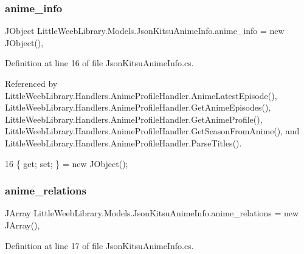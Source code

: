\subsubsection{\texorpdfstring{anime\+\_\+info}{anime\_info}}
{\footnotesize\ttfamily J\+Object Little\+Weeb\+Library.\+Models.\+Json\+Kitsu\+Anime\+Info.\+anime\+\_\+info = new J\+Object()\hspace{0.3cm}{\ttfamily [get]}, {\ttfamily [set]}}



Definition at line 16 of file Json\+Kitsu\+Anime\+Info.\+cs.



Referenced by Little\+Weeb\+Library.\+Handlers.\+Anime\+Profile\+Handler.\+Anime\+Latest\+Episode(), Little\+Weeb\+Library.\+Handlers.\+Anime\+Profile\+Handler.\+Get\+Anime\+Episodes(), Little\+Weeb\+Library.\+Handlers.\+Anime\+Profile\+Handler.\+Get\+Anime\+Profile(), Little\+Weeb\+Library.\+Handlers.\+Anime\+Profile\+Handler.\+Get\+Season\+From\+Anime(), and Little\+Weeb\+Library.\+Handlers.\+Anime\+Profile\+Handler.\+Parse\+Titles().


\begin{DoxyCode}
16 \{ \textcolor{keyword}{get}; \textcolor{keyword}{set}; \} = \textcolor{keyword}{new} JObject();
\end{DoxyCode}
\mbox{\label{class_little_weeb_library_1_1_models_1_1_json_kitsu_anime_info_a8df2cf3af93654bd0362985dfd3208e0}} 
\subsubsection{\texorpdfstring{anime\+\_\+relations}{anime\_relations}}
{\footnotesize\ttfamily J\+Array Little\+Weeb\+Library.\+Models.\+Json\+Kitsu\+Anime\+Info.\+anime\+\_\+relations = new J\+Array()\hspace{0.3cm}{\ttfamily [get]}, {\ttfamily [set]}}



Definition at line 17 of file Json\+Kitsu\+Anime\+Info.\+cs.



